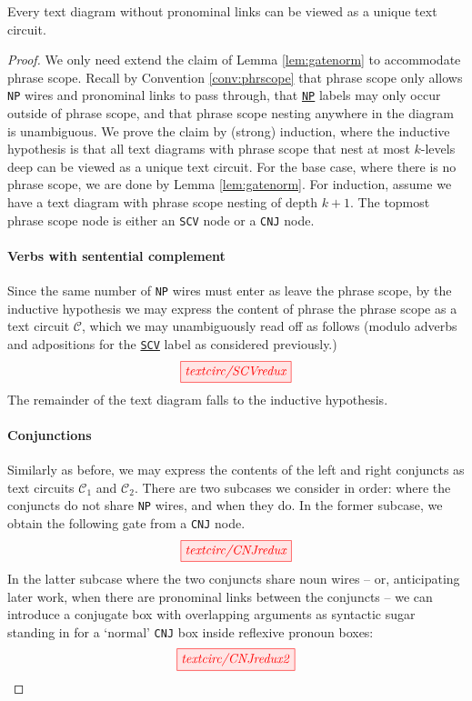 \begin{lemma}\label{lem:diagnorm}
Every text diagram without pronominal links can be viewed as a unique text circuit.
\begin{proof}
We only need extend the claim of Lemma \ref{lem:gatenorm} to accommodate phrase scope. Recall by Convention \ref{conv:phrscope} that phrase scope only allows \texttt{NP} wires and pronominal links to pass through, that \texttt{\underline{NP}} labels may only occur outside of phrase scope, and that phrase scope nesting anywhere in the diagram is unambiguous. We prove the claim by (strong) induction, where the inductive hypothesis is that all text diagrams with phrase scope that nest at most $k$-levels deep can be viewed as a unique text circuit.
For the base case, where there is no phrase scope, we are done by Lemma \ref{lem:gatenorm}.
For induction, assume we have a text diagram with phrase scope nesting of depth $k+1$. The topmost phrase scope node is either an \texttt{SCV} node or a \texttt{CNJ} node.
\paragraph{Verbs with sentential complement} Since the same number of \texttt{NP} wires must enter as leave the phrase scope, by the inductive hypothesis we may express the content of phrase the phrase scope as a text circuit $\mathcal{C}$, which we may unambiguously read off as follows (modulo adverbs and adpositions for the \texttt{\underline{SCV}} label as considered previously.)
\[\tikzfig{textcirc/SCVredux}\]
The remainder of the text diagram falls to the inductive hypothesis.
\paragraph{Conjunctions}
Similarly as before, we may express the contents of the left and right conjuncts as text circuits $\mathcal{C}_1$ and $\mathcal{C}_2$. There are two subcases we consider in order: where the conjuncts do not share \texttt{NP} wires, and when they do. In the former subcase, we obtain the following gate from a \texttt{CNJ} node.
\[\tikzfig{textcirc/CNJredux}\]
In the latter subcase where the two conjuncts share noun wires -- or, anticipating later work, when there are pronominal links between the conjuncts -- we can introduce a conjugate box with overlapping arguments as syntactic sugar standing in for a `normal' \texttt{CNJ} box inside reflexive pronoun boxes:
\[
\tikzfig{textcirc/CNJredux2}
\]
\end{proof}
\end{lemma}

